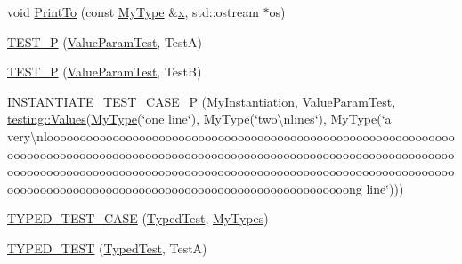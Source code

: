 \begin{DoxyCompactItemize}
\item 
void \mbox{\hyperlink{_obj__test_2lib_2googletest-release-1_88_81_2googletest_2test_2googletest-list-tests-unittest___8cc_aaf76f8f336db1c295fe3aa914c4c6182}{Print\+To}} (const \mbox{\hyperlink{class_my_type}{My\+Type}} \&\mbox{\hyperlink{_obj__test_2lib_2googletest-master_2googlemock_2test_2gmock-matchers__test_8cc_a6150e0515f7202e2fb518f7206ed97dc}{x}}, std\+::ostream $\ast$os)
\item 
\mbox{\hyperlink{_obj__test_2lib_2googletest-release-1_88_81_2googletest_2test_2googletest-list-tests-unittest___8cc_adc97fba291db78177b4e5bdf6f6d9018}{T\+E\+S\+T\+\_\+P}} (\mbox{\hyperlink{class_value_param_test}{Value\+Param\+Test}}, TestA)
\item 
\mbox{\hyperlink{_obj__test_2lib_2googletest-release-1_88_81_2googletest_2test_2googletest-list-tests-unittest___8cc_aa743157309ca6126251b87f7436205a1}{T\+E\+S\+T\+\_\+P}} (\mbox{\hyperlink{class_value_param_test}{Value\+Param\+Test}}, TestB)
\item 
\mbox{\hyperlink{_obj__test_2lib_2googletest-release-1_88_81_2googletest_2test_2googletest-list-tests-unittest___8cc_aae3f9f4ba0f7ea179b0976679d0906c6}{I\+N\+S\+T\+A\+N\+T\+I\+A\+T\+E\+\_\+\+T\+E\+S\+T\+\_\+\+C\+A\+S\+E\+\_\+P}} (My\+Instantiation, \mbox{\hyperlink{class_value_param_test}{Value\+Param\+Test}}, \mbox{\hyperlink{namespacetesting_abd3c87b40c2a0663691c9b617ed5fcc2}{testing\+::\+Values}}(\mbox{\hyperlink{class_my_type}{My\+Type}}(\char`\"{}one line\char`\"{}), My\+Type(\char`\"{}two\textbackslash{}nlines\char`\"{}), My\+Type(\char`\"{}a very\textbackslash{}nloooooooooooooooooooooooooooooooooooooooooooooooooooooooooooooooooooooooooooooooooooooooooooooooooooooooooooooooooooooooooooooooooooooooooooooooooooooooooooooooooooooooooooooooooooooooooooooooooooooooooooooooooooooooooooooooooooooooooooooooooooooooooong line\char`\"{})))
\item 
\mbox{\hyperlink{_obj__test_2lib_2googletest-release-1_88_81_2googletest_2test_2googletest-list-tests-unittest___8cc_a862ed8944c2b3e4827e95002d20c45d3}{T\+Y\+P\+E\+D\+\_\+\+T\+E\+S\+T\+\_\+\+C\+A\+SE}} (\mbox{\hyperlink{class_typed_test}{Typed\+Test}}, \mbox{\hyperlink{googletest-master_2googletest_2test_2googletest-list-tests-unittest___8cc_a16f58cd49c18568802322bbaf9f3f654}{My\+Types}})
\item 
\mbox{\hyperlink{_obj__test_2lib_2googletest-release-1_88_81_2googletest_2test_2googletest-list-tests-unittest___8cc_a83ec84c5fac9fdffa59a16e5d043bd66}{T\+Y\+P\+E\+D\+\_\+\+T\+E\+ST}} (\mbox{\hyperlink{class_typed_test}{Typed\+Test}}, TestA)

\end{DoxyCompactItemize}
